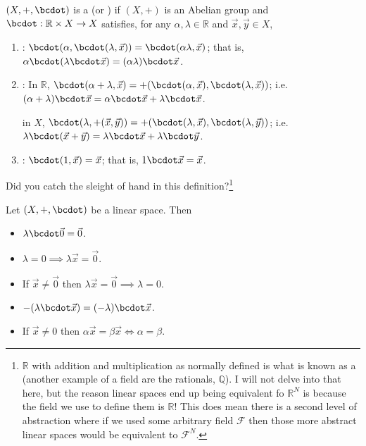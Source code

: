 \documentclass{article}
\begin{document}
\begin{definition}
  $(X, +, \bcdot)$ is a  (or ) if $(X, +)$ is an Abelian group and $\bcdot: \mathbb{R} \times X \to X$ satisfies, for any $\alpha, \lambda \in \mathbb{R}$ and $\vec{x}, \vec{y} \in X$,
  \begin{enumerate}
    \item {}: $\bcdot(\alpha, \bcdot(\lambda, \vec{x})) = \bcdot(\alpha \lambda, \vec{x})$; that is, $\alpha \bcdot (\lambda \bcdot \vec{x}) = (\alpha \lambda) \bcdot \vec{x}$.

    \item {}: In $\mathbb{R}$, $\bcdot(\alpha + \lambda, \vec{x}) = +(\bcdot(\alpha, \vec{x}), \bcdot(\lambda, \vec{x}))$; i.e. $(\alpha + \lambda) \bcdot \vec{x} = \alpha \bcdot \vec{x} + \lambda \bcdot \vec{x}$.

      in $X$, $\bcdot(\lambda, +(\vec{x}, \vec{y})) = +(\bcdot(\lambda, \vec{x}), \bcdot(\lambda, \vec{y}))$; i.e. $\lambda \bcdot (\vec{x} + \vec{y}) = \lambda \bcdot \vec{x} + \lambda \bcdot \vec{y}$.

    \item {}: $\bcdot(1, \vec{x}) = \vec{x}$; that is, $1 \bcdot \vec{x} = \vec{x}$.
  \end{enumerate}
\end{definition}

Did you catch the sleight of hand in this definition?\footnote{$\mathbb{R}$ with addition and multiplication as normally defined is what is known as a  (another  example of a field are the rationals, $\mathbb{Q}$). I will not  delve into that here, but the reason linear spaces end up being equivalent fo $\mathbb{R}^N$ is because the field we use to define them is $\mathbb{R}$! This does mean there is a second level of abstraction where if we used some arbitrary field $\mathcal{F}$ then those more abstract linear spaces would be equivalent to $\mathcal{F}^N$.}
\begin{claim}
  Let $(X, +, \bcdot)$ be a linear space. Then
  \begin{itemize}[label=$\bullet$]
    \item $\lambda \bcdot \vec{0} = \vec{0}$.

    \item $\lambda = 0 \implies \lambda \vec{x} = \vec{0}$.

    \item If $\vec{x} \ne \vec{0}$ then $\lambda \vec{x} = \vec{0} \implies \lambda = 0$.

    \item $-(\lambda \bcdot \vec{x}) = (-\lambda) \bcdot \vec{x}$.

    \item If $\vec{x} \ne  0$ then $\alpha \vec{x} = \beta \vec{x} \iff \alpha = \beta$.
  \end{itemize}
\end{claim}
\end{document}
